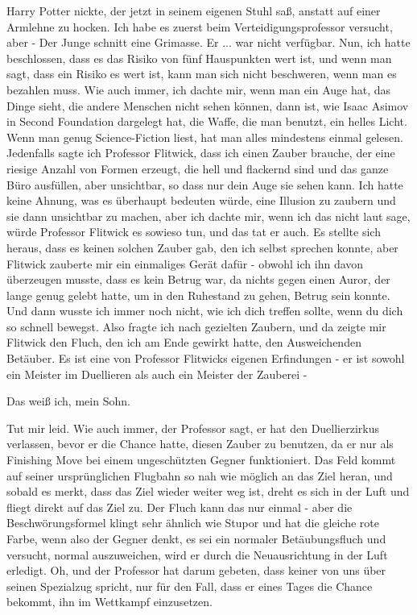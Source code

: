 Harry Potter nickte, der jetzt in seinem eigenen Stuhl saß, anstatt auf einer
Armlehne zu hocken. \glqq{}Ich habe es zuerst beim Verteidigungsprofessor
versucht, aber -\grqq{} Der Junge schnitt eine Grimasse. \glqq{}Er ... war nicht
verfügbar. Nun, ich hatte beschlossen, dass es das Risiko von fünf Hauspunkten
wert ist, und wenn man sagt, dass ein Risiko es wert ist, kann man sich nicht
beschweren, wenn man es bezahlen muss. Wie auch immer, ich dachte mir, wenn man
ein Auge hat, das Dinge sieht, die andere Menschen nicht sehen können, dann ist,
wie Isaac Asimov in \glqq{}Second Foundation\grqq{} dargelegt hat, die Waffe, die
man benutzt, ein helles Licht. Wenn man genug Science-Fiction liest, hat man
alles mindestens einmal gelesen. Jedenfalls sagte ich Professor Flitwick, dass
ich einen Zauber brauche, der eine riesige Anzahl von Formen erzeugt, die hell
und flackernd sind und das ganze Büro ausfüllen, aber unsichtbar, so dass nur
dein Auge sie sehen kann. Ich hatte keine Ahnung, was es überhaupt bedeuten
würde, eine Illusion zu zaubern und sie dann unsichtbar zu machen, aber ich
dachte mir, wenn ich das nicht laut sage, würde Professor Flitwick es sowieso
tun, und das tat er auch. Es stellte sich heraus, dass es keinen solchen Zauber
gab, den ich selbst sprechen konnte, aber Flitwick zauberte mir ein einmaliges
Gerät dafür - obwohl ich ihn davon überzeugen musste, dass es kein Betrug war,
da nichts gegen einen Auror, der lange genug gelebt hatte, um in den Ruhestand
zu gehen, Betrug sein konnte. Und dann wusste ich immer noch nicht, wie ich dich
treffen sollte, wenn du dich so schnell bewegst. Also fragte ich nach gezielten
Zaubern, und da zeigte mir Flitwick den Fluch, den ich am Ende gewirkt hatte,
den \glqq{}Ausweichenden Betäuber\grqq{}. Es ist eine von Professor Flitwicks
eigenen Erfindungen - er ist sowohl ein Meister im Duellieren als auch ein
Meister der Zauberei -\grqq{}

\glqq{}Das weiß ich, mein Sohn.\grqq{}

\glqq{}Tut mir leid. Wie auch immer, der Professor sagt, er hat den
Duellierzirkus verlassen, bevor er die Chance hatte, diesen Zauber zu benutzen,
da er nur als Finishing Move bei einem ungeschützten Gegner funktioniert. Das
Feld kommt auf seiner ursprünglichen Flugbahn so nah wie möglich an das Ziel
heran, und sobald es merkt, dass das Ziel wieder weiter weg ist, dreht es sich
in der Luft und fliegt direkt auf das Ziel zu. Der Fluch kann das nur einmal -
aber die Beschwörungsformel klingt sehr ähnlich wie \glqq{}Stupor\grqq{} und hat
die gleiche rote Farbe, wenn also der Gegner denkt, es sei ein normaler
Betäubungsfluch und versucht, normal auszuweichen, wird er durch die
Neuausrichtung in der Luft erledigt. Oh, und der Professor hat darum gebeten,
dass keiner von uns über seinen Spezialzug spricht, nur für den Fall, dass er
eines Tages die Chance bekommt, ihn im Wettkampf einzusetzen.\grqq{}

